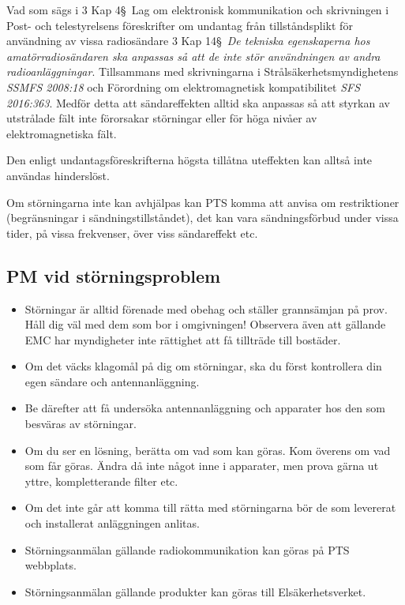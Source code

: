 Vad som sägs i 3 Kap 4\S~Lag om elektronisk kommunikation och skrivningen i
Post- och telestyrelsens föreskrifter om undantag från tillståndsplikt för
användning av vissa radiosändare 3 Kap 14\S~\emph{De tekniska egenskaperna hos
	amatörradiosändaren ska anpassas så att de inte stör användningen av andra
	radioanläggningar}.
Tillsammans med skrivningarna i Strålsäkerhetsmyndighetens \emph{SSMFS 2008:18}
och Förordning om elektromagnetisk kompatibilitet \emph{SFS 2016:363}.
Medför detta att sändareffekten alltid ska anpassas så att styrkan av utstrålade
fält inte förorsakar störningar eller för höga nivåer av elektromagnetiska fält.

Den enligt undantagsföreskrifterna högsta tillåtna uteffekten kan alltså inte
användas hinderslöst.

Om störningarna inte kan avhjälpas kan PTS komma att anvisa om restriktioner
(begränsningar i sändningstillståndet), det kan vara sändningsförbud under
vissa tider, på vissa frekvenser, över viss sändareffekt etc.

\subsection{PM vid störningsproblem}

\begin{itemize}
	\item Störningar är alltid förenade med obehag och ställer grannsämjan på prov.
	Håll dig väl med dem som bor i omgivningen! Observera även att gällande EMC
	har myndigheter inte rättighet att få tillträde till bostäder.
	\item Om det väcks klagomål på dig om störningar, ska du först
	kontrollera din egen sändare och antennanläggning.
	\item Be därefter att få undersöka antennanläggning och apparater hos
	den som besväras av störningar.
	\item Om du ser en lösning, berätta om vad som kan göras.
	Kom överens om vad som får göras.
	Ändra då inte något inne i apparater, men prova gärna ut yttre,
	kompletterande filter etc.
	\item Om det inte går att komma till rätta med störningarna bör de som
	levererat och installerat anläggningen anlitas.
	\item Störningsanmälan gällande radiokommunikation kan göras på PTS webbplats.
	\item Störningsanmälan gällande produkter kan göras till Elsäkerhetsverket.
\end{itemize}

